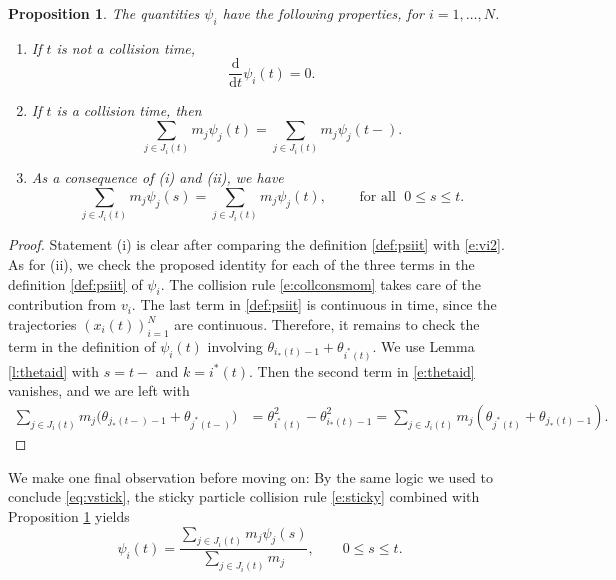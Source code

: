 \documentclass[11pt,reqno]{amsart}
\newtheorem{proposition}[theorem]{Proposition}
\theoremstyle{definition}
\theoremstyle{remark}
\def\dd{\mathrm{d}}
\begin{document}
	\newpage
	\begin{proposition}\label{prop:psii}
		The quantities $\psi_i$ have the following properties, for $i = 1,\ldots, N$.
		\begin{enumerate}[label = \emph{(\roman*)}]
			\item If $t$ is not a collision time, 
			\begin{equation}
				\label{eq:psii0}
				\frac{\dd}{\dd t}\psi_i(t) = 0.
			\end{equation}
			\item  If $t$ is a collision time, then
			\begin{equation}
				\sum_{j\in J_i(t)} m_j\psi_{j}(t) = \sum_{j\in J_i(t)} m_{j}\psi_{j}(t-).
			\end{equation}
			\item As a consequence of \emph{(i)} and \emph{(ii)}, we have 
			\begin{equation}\label{eq:psiit}
				\sum_{j\in J_i(t)} m_j\psi_{j}(s) = \sum_{j\in J_i(t)} m_{j}\psi_{j}(t),\qquad \text{ for all }\; 0\le s\le t.
			\end{equation}
		\end{enumerate}	
	\end{proposition}
	\begin{proof}
		Statement (i) is clear after comparing the definition \eqref{def:psiit} with \eqref{e:vi2}. As for (ii), we check the proposed identity for each of the three terms in the definition \eqref{def:psiit} of $\psi_i$.  The collision rule \eqref{e:collconsmom} takes care of the contribution from $v_i$.  The last term in  \eqref{def:psiit} is continuous in time, since the trajectories $(x_i(t))_{i=1}^N$ are continuous.  
		Therefore, it remains to check the term in the definition of $\psi_i(t)$ involving $\theta_{i_*(t)-1} + \theta_{i^*(t)}$.  We use Lemma \ref{l:thetaid} with $s = t-$ and $k = i^*(t)$. Then the second term in \eqref{e:thetaid} vanishes, and we are left with
		\begin{align*}
			\sum_{j\in J_i(t)} m_{j}\big(\theta_{j_*(t-)-1}+\theta_{j^*(t-)}\big)
			& = \theta_{i^*(t)}^2 - \theta_{i_*(t)-1}^2 = 
			\sum_{j\in J_i(t)} m_j (\theta_{j^*(t)} + \theta_{j_*(t)-1}).
		\end{align*}
	\end{proof}
	

	
	We make one final observation before moving on: By the same logic we used to conclude \eqref{eq:vstick}, the sticky particle collision rule \eqref{e:sticky} combined with Proposition \ref{prop:psii} yields
	\begin{equation}
		\psi_i(t) = \frac{\sum_{j\in J_i(t)} m_j \psi_j(s)}{\sum_{j\in J_i(t)} m_j},
		\qquad 0\le s\le t.
	\end{equation}
	
\end{document}
